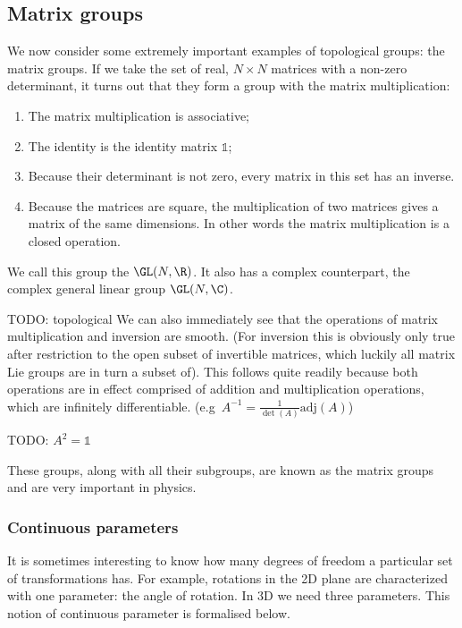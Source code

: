 \subsection{Matrix groups}
We now consider some extremely important examples of topological groups: the matrix groups.
If we take the set of real, $N\times N$ matrices with a non-zero determinant, it turns out that they form a group with the matrix multiplication:
\begin{enumerate}
\item The matrix multiplication is associative;
\item The identity is the identity matrix $\mathbb{1}$;
\item Because their determinant is not zero, every matrix in this set has an inverse.
\item Because the matrices are square, the multiplication of two matrices gives a matrix of the same dimensions. In other words the matrix multiplication is a closed operation.
\end{enumerate}
We call this group the  $\GL(N, \R)$. It also has a complex counterpart, the complex general linear group $\GL(N, \C)$.

TODO: topological
We can also immediately see that the operations of matrix multiplication and inversion are smooth. (For inversion this is obviously only true after restriction to the open subset of invertible matrices, which luckily all matrix Lie groups are in turn a subset of). This follows quite readily because both operations are in effect comprised of addition and multiplication operations, which are infinitely differentiable. (e.g\ $A^{-1} = \frac{1}{\det(A)}\mathrm{adj}(A)$)

\begin{example}
TODO: $A^2 = \mathbb{1}$
\end{example}

These groups, along with all their subgroups, are known as the matrix groups and are very important in physics.

\subsubsection{Continuous parameters}
It is sometimes interesting to know how many degrees of freedom a particular set of transformations has. For example, rotations in the 2D plane are characterized with one parameter: the angle of rotation. In 3D we need three parameters. This notion of continuous parameter is formalised below.


